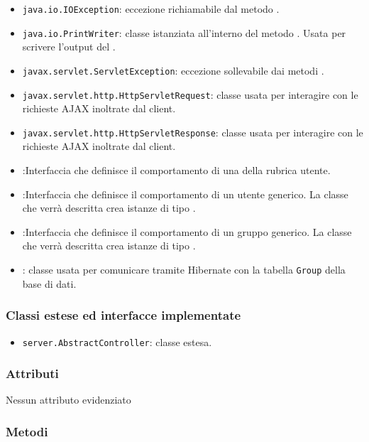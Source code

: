 \begin{itemize}
	\item \texttt{java.io.IOException}: eccezione richiamabile dal metodo .
	\item \texttt{java.io.PrintWriter}: classe istanziata all'interno del metodo . Usata per scrivere l'output del .
	\item \texttt{javax.servlet.ServletException}: eccezione sollevabile dai metodi .
	\item \texttt{javax.servlet.http.HttpServletRequest}: classe usata per interagire con le richieste AJAX inoltrate dal client.
	\item \texttt{javax.servlet.http.HttpServletResponse}: classe usata per interagire con le richieste AJAX inoltrate dal client.
	\item {}:Interfaccia che definisce il comportamento di una  della rubrica utente.
	\item {}:Interfaccia che definisce il comportamento di un utente generico. La classe che verrà descritta crea istanze di tipo .
		\item {}:Interfaccia che definisce il comportamento di un gruppo generico. La classe che verrà descritta crea istanze di tipo .
	\item {}: classe usata per comunicare tramite Hibernate con la tabella \texttt{Group} della base di dati.
\end{itemize}

\subsubsection*{Classi estese ed interfacce implementate}
\begin{itemize}
	\item \texttt{server.AbstractController}: classe estesa.
\end{itemize}

\subsubsection*{Attributi}

Nessun attributo evidenziato

\subsubsection*{Metodi}

